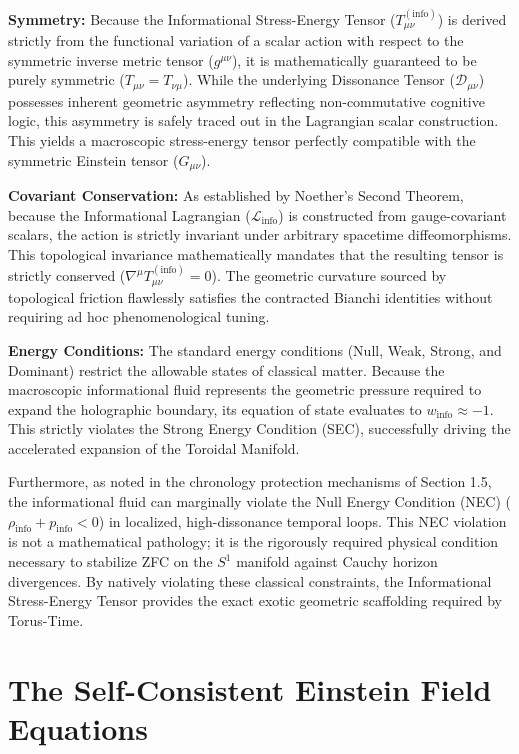\documentclass[12pt,openany]{book}
\theoremstyle{plain}
\theoremstyle{definition}
\theoremstyle{remark}
\begin{document}
\textbf{Symmetry:} Because the Informational Stress-Energy Tensor ($T_{\mu\nu}^{(\text{info})}$) is derived strictly from the functional variation of a scalar action with respect to the symmetric inverse metric tensor ($g^{\mu\nu}$), it is mathematically guaranteed to be purely symmetric ($T_{\mu\nu} = T_{\nu\mu}$). While the underlying Dissonance Tensor ($\mathcal{D}_{\mu\nu}$) possesses inherent geometric asymmetry reflecting non-commutative cognitive logic, this asymmetry is safely traced out in the Lagrangian scalar construction. This yields a macroscopic stress-energy tensor perfectly compatible with the symmetric Einstein tensor ($G_{\mu\nu}$).

\textbf{Covariant Conservation:} As established by Noether's Second Theorem, because the Informational Lagrangian ($\mathcal{L}_{\text{info}}$) is constructed from gauge-covariant scalars, the action is strictly invariant under arbitrary spacetime diffeomorphisms. This topological invariance mathematically mandates that the resulting tensor is strictly conserved ($\nabla^\mu T_{\mu\nu}^{(\text{info})} = 0$). The geometric curvature sourced by topological friction flawlessly satisfies the contracted Bianchi identities without requiring ad hoc phenomenological tuning.

\textbf{Energy Conditions:} The standard energy conditions (Null, Weak, Strong, and Dominant) restrict the allowable states of classical matter. Because the macroscopic informational fluid represents the geometric pressure required to expand the holographic boundary, its equation of state evaluates to $w_{\text{info}} \approx -1$. This strictly violates the Strong Energy Condition (SEC), successfully driving the accelerated expansion of the Toroidal Manifold. 

Furthermore, as noted in the chronology protection mechanisms of Section 1.5, the informational fluid can marginally violate the Null Energy Condition (NEC) ($\rho_{\text{info}} + p_{\text{info}} < 0$) in localized, high-dissonance temporal loops. This NEC violation is not a mathematical pathology; it is the rigorously required physical condition necessary to stabilize ZFC on the $S^1$ manifold against Cauchy horizon divergences. By natively violating these classical constraints, the Informational Stress-Energy Tensor provides the exact exotic geometric scaffolding required by Torus-Time.

\section{The Self-Consistent Einstein Field Equations}
\end{document}
